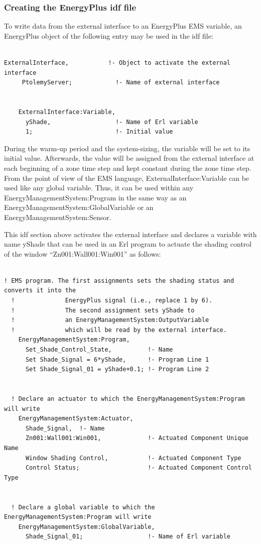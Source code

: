 \subsubsection{Creating the EnergyPlus idf file}\label{creating-the-energyplus-idf-file-2}

To write data from the external interface to an EnergyPlus EMS variable, an EnergyPlus object of the following entry may be used in the idf file:

\begin{lstlisting}

ExternalInterface,           !- Object to activate the external interface
     PtolemyServer;            !- Name of external interface


    ExternalInterface:Variable,
      yShade,                  !- Name of Erl variable
      1;                       !- Initial value
\end{lstlisting}

During the warm-up period and the system-sizing, the variable will be set to its initial value. Afterwards, the value will be assigned from the external interface at each beginning of a zone time step and kept constant during the zone time step. From the point of view of the EMS language, ExternalInterface:Variable can be used like any global variable. Thus, it can be used within any EnergyManagementSystem:Program in the same way as an EnergyManagementSystem:GlobalVariable or an EnergyManagementSystem:Sensor.

This idf section above activates the external interface and declares a variable with name yShade that can be used in an Erl program to actuate the shading control of the window ``Zn001:Wall001:Win001'' as follows:

\begin{lstlisting}

! EMS program. The first assignments sets the shading status and converts it into the
  !              EnergyPlus signal (i.e., replace 1 by 6).
  !              The second assignment sets yShade to
  !              an EnergyManagementSystem:OutputVariable
  !              which will be read by the external interface.
    EnergyManagementSystem:Program,
      Set_Shade_Control_State,          !- Name
      Set Shade_Signal = 6*yShade,      !- Program Line 1
      Set Shade_Signal_01 = yShade+0.1; !- Program Line 2


  ! Declare an actuator to which the EnergyManagementSystem:Program will write
    EnergyManagementSystem:Actuator,
      Shade_Signal,  !- Name
      Zn001:Wall001:Win001,             !- Actuated Component Unique Name
      Window Shading Control,           !- Actuated Component Type
      Control Status;                   !- Actuated Component Control Type


  ! Declare a global variable to which the EnergyManagementSystem:Program will write
    EnergyManagementSystem:GlobalVariable,
      Shade_Signal_01;                  !- Name of Erl variable
\end{lstlisting}

